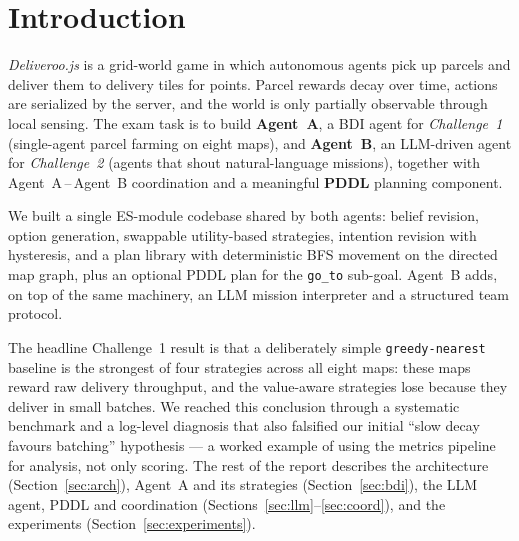 \section{Introduction}

\emph{Deliveroo.js} is a grid-world game in which autonomous agents pick up
parcels and deliver them to delivery tiles for points. Parcel rewards decay
over time, actions are serialized by the server, and the world is only
partially observable through local sensing. The exam task is to build
\textbf{Agent~A}, a BDI agent for \emph{Challenge~1} (single-agent parcel
farming on eight maps), and \textbf{Agent~B}, an LLM-driven agent for
\emph{Challenge~2} (agents that shout natural-language missions), together with
Agent~A\,--\,Agent~B coordination and a meaningful \textbf{PDDL} planning
component.

We built a single ES-module codebase shared by both agents: belief revision,
option generation, swappable utility-based strategies, intention revision with
hysteresis, and a plan library with deterministic BFS movement on the directed
map graph, plus an optional PDDL plan for the \texttt{go\_to} sub-goal. Agent~B
adds, on top of the same machinery, an LLM mission interpreter and a structured
team protocol.

The headline Challenge~1 result is that a deliberately simple
\texttt{greedy-nearest} baseline is the strongest of four strategies across all
eight maps: these maps reward raw delivery throughput, and the value-aware
strategies lose because they deliver in small batches. We reached this
conclusion through a systematic benchmark and a log-level diagnosis that also
falsified our initial ``slow decay favours batching'' hypothesis --- a worked
example of using the metrics pipeline for analysis, not only scoring. The rest
of the report describes the architecture (Section~\ref{sec:arch}), Agent~A and
its strategies (Section~\ref{sec:bdi}), the LLM agent, PDDL and coordination
(Sections~\ref{sec:llm}--\ref{sec:coord}), and the experiments
(Section~\ref{sec:experiments}).
